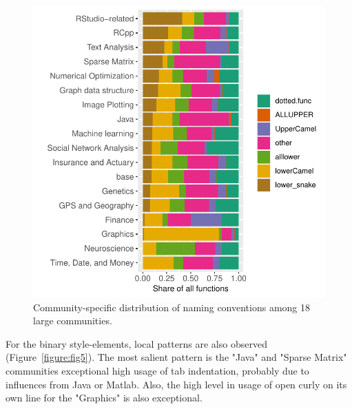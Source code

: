 \begin{figure}[htbp]
  \centering
  \includegraphics{fig4}
  \caption{Community-specific distribution of naming conventions among 18 large communities.}
  \label{figure:fig4}
\end{figure}

For the binary style-elements, local patterns are also observed (Figure~\ref{figure:fig5}). The most salient pattern is the "Java" and "Sparse Matrix" communities exceptional high usage of tab indentation, probably due to influences from Java or Matlab. Also, the high level in usage of open curly on its own line for the "Graphics" is also exceptional.


